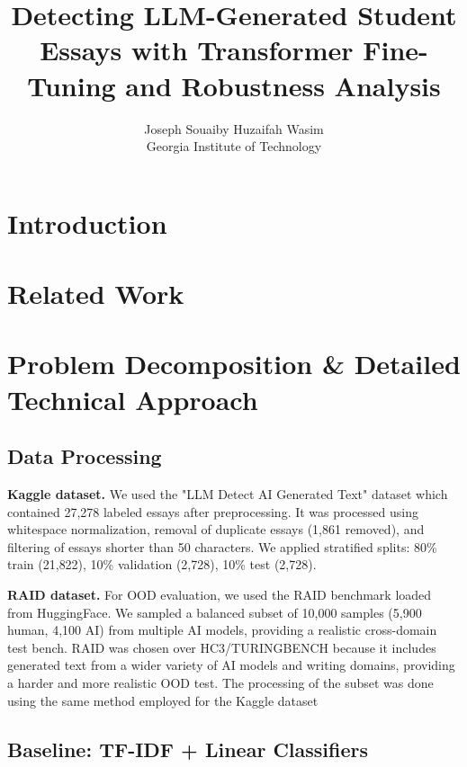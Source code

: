 \documentclass{article} %
\title{Detecting LLM-Generated Student Essays with Transformer Fine-Tuning and Robustness Analysis}
\author{Joseph Souaiby \quad Huzaifah Wasim \\
Georgia Institute of Technology 
}
\begin{document}
\maketitle

\section{Introduction}




\section{Related Work}



\section{Problem Decomposition \& Detailed Technical Approach}



\subsection{Data Processing}

\textbf{Kaggle dataset.} We used the "LLM Detect AI Generated Text" dataset \citep{thite2026kaggle}
which contained 27{,}278 labeled essays after preprocessing. It was processed using whitespace normalization,
removal of duplicate essays (1{,}861 removed), and filtering of essays shorter than 50
characters. We applied stratified splits: 80\% train (21{,}822), 10\% validation (2{,}728),
10\% test (2{,}728).

\textbf{RAID dataset.} For OOD evaluation, we used the RAID benchmark \citep{dugan2024raid}
loaded from HuggingFace. We sampled a balanced subset of 10{,}000
samples (5{,}900 human, 4{,}100 AI) from multiple AI models, providing a realistic
cross-domain test bench. RAID was chosen over HC3/TURINGBENCH because it includes generated text from a wider variety of AI models and writing domains, providing a harder and more realistic OOD test. The processing of the subset was done using the same method employed for the Kaggle dataset

\subsection{Baseline: TF-IDF + Linear Classifiers}
\end{document}
